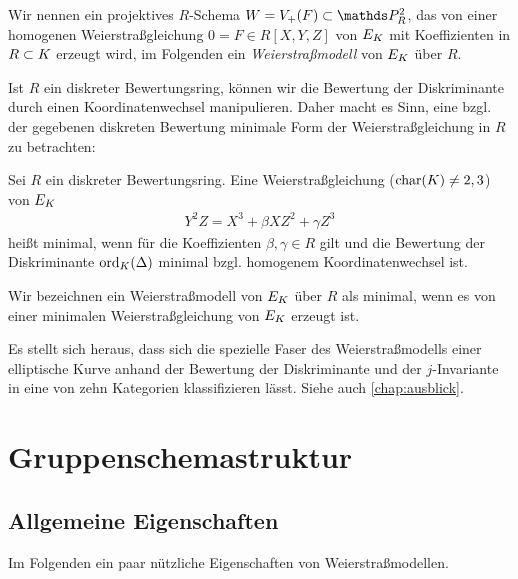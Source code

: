 \begin{Definition}[Weierstraßmodell]
  Wir nennen ein projektives $R$-Schema $W=V_+(F)\subset\P_R^2$, das
  von einer homogenen Weierstraßgleichung $0=F\in R[X,Y,Z]$ von $E_{K}$
  mit Koeffizienten in $R\subset K$ erzeugt wird, im Folgenden
  ein \emph{Weierstraßmodell} von $E_{K}$ über $R$.
\end{Definition}

Ist $R$ ein diskreter Bewertungsring, können wir die Bewertung der
Diskriminante durch einen Koordinatenwechsel manipulieren. Daher macht
es Sinn, eine bzgl. der gegebenen diskreten Bewertung minimale
Form der Weierstraßgleichung in $R$ zu betrachten:
\begin{Definition}
  Sei $R$ ein diskreter Bewertungsring.
  Eine Weierstraßgleichung ($\operatorname{char}(K)\neq2,3$) von $E_{K}$
  \begin{gather*}
    Y^2Z = X^3 + \beta XZ^2 + \gamma Z^3
  \end{gather*}
  heißt minimal, wenn für die Koeffizienten $\beta, \gamma\in R$ gilt
  und die Bewertung der Diskriminante $\operatorname{ord}_{K}(\Delta)$ minimal
  bzgl. homogenem Koordinatenwechsel ist.

  Wir bezeichnen ein Weierstraßmodell von $E_{K}$ über $R$ als minimal,
  wenn es von einer minimalen Weierstraßgleichung von $E_{K}$ erzeugt
  ist.
\end{Definition}
Es stellt sich heraus, dass sich die spezielle Faser des
Weierstraßmodells einer elliptische Kurve anhand der
Bewertung der Diskriminante und der $j$-Invariante in eine von zehn
Kategorien klassifizieren lässt. Siehe auch \autoref{chap:ausblick}. 


\section{Gruppenschemastruktur}\label{chap:weierstraßgruppe}
\subsection{Allgemeine Eigenschaften}
Im Folgenden ein paar nützliche Eigenschaften von Weierstraßmodellen.

